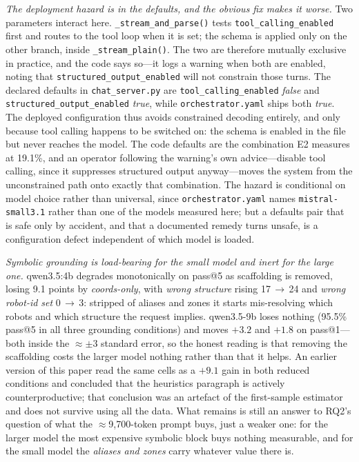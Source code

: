 \documentclass[10pt,twocolumn]{article}
\newcommand{\code}[1]{\texttt{\small #1}}
\begin{document}
\emph{The deployment hazard is in the defaults, and the obvious fix makes it
worse.} Two parameters interact here. \code{\_stream\_and\_parse()} tests
\code{tool\_calling\_enabled} first and routes to the tool loop when it is
set; the schema is applied only on the other branch, inside
\code{\_stream\_plain()}. The two are therefore mutually exclusive in
practice, and the code says so---it logs a warning when both are enabled,
noting that \code{structured\_output\_enabled} will not constrain those turns.
The declared defaults in \code{chat\_server.py} are
\code{tool\_calling\_enabled} \emph{false} and
\code{structured\_output\_enabled} \emph{true}, while
\code{orchestrator.yaml} ships both \emph{true}. The deployed configuration
thus avoids constrained decoding entirely, and only because tool calling
happens to be switched on: the schema is enabled in the file but never
reaches the model. The code defaults are the combination E2 measures at
19.1\%, and an operator following the warning's own advice---disable tool
calling, since it suppresses structured output anyway---moves the system from
the unconstrained path onto exactly that combination. The hazard is
conditional on model choice rather than universal, since
\code{orchestrator.yaml} names \code{mistral-small3.1} rather than one of the
models measured here; but a defaults pair that is safe only by accident, and
that a documented remedy turns unsafe, is a configuration defect independent
of which model is loaded.

\emph{Symbolic grounding is load-bearing for the small model and inert for the
large one.} qwen3.5:4b degrades monotonically on pass@5 as scaffolding is
removed, losing 9.1 points by \emph{coords-only},
with \emph{wrong structure} rising 17\,$\to$\,24 and \emph{wrong robot-id
set} 0\,$\to$\,3: stripped of aliases and zones it starts mis-resolving which
robots and which structure the request implies. qwen3.5-9b loses nothing
(95.5\% pass@5 in all three grounding conditions) and moves $+3.2$ and $+1.8$
on pass@1---both inside the $\approx\pm3$ standard error, so the honest
reading is that removing the scaffolding costs the larger model nothing rather
than that it helps. An earlier version of this paper read the same cells as a
$+9.1$ gain in both reduced conditions and concluded that the heuristics
paragraph is actively counterproductive; that conclusion was an artefact of
the first-sample estimator and does not survive using all the data. What
remains is still an answer to RQ2's question of what the
$\approx$9{,}700-token prompt buys, just a weaker one: for the larger model
the most expensive symbolic block buys nothing measurable, and for the small
model the \emph{aliases and zones} carry whatever value there is.
\end{document}
